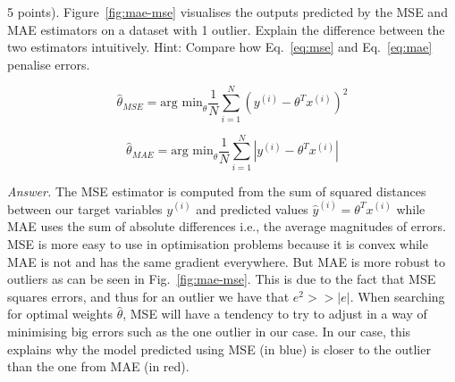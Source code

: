 \documentclass[10pt]{article}
\newenvironment{exercise}[2][Exercise]{\begin{trivlist}
  \item[\hskip \labelsep {\bfseries #1}\hskip \labelsep {\bfseries #2.}]}{\end{trivlist}}
\begin{document}
  \begin{exercise}{1} 
  (5 points).
  Figure~\ref{fig:mae-mse} visualises the outputs predicted by the MSE
and MAE estimators on a dataset with 1 outlier. Explain the difference between the two estimators intuitively. Hint: Compare how Eq.~\ref{eq:mse} and Eq.~\ref{eq:mae} penalise errors. 

\begin{equation}\label{eq:mse}
    \hat\theta_{MSE} = \text{arg min}_\theta \frac{1}{N} \sum_{i=1}^N(y^{(i)}-\theta^Tx^{(i)})^2
\end{equation}

\begin{equation}\label{eq:mae}
    \hat\theta_{MAE} = \text{arg min}_\theta  \frac{1}{N} \sum_{i=1}^N|y^{(i)}-\theta^Tx^{(i)}|
\end{equation}


\textit{Answer.} The MSE estimator is computed from the sum of squared distances between our target variables $y^{(i)}$ and predicted values $\hat y^{(i)} = \theta^Tx^{(i)}$ while MAE uses the sum of absolute differences i.e., the average magnitudes of errors. MSE is more easy to use in optimisation problems because it is convex while MAE is not and has the same gradient everywhere. But MAE is more robust to outliers as can be seen in Fig.~\ref{fig:mae-mse}. This is due to the fact that MSE squares errors, and thus for an outlier we have that $e^2 >> |e|$. When searching for optimal weights $\hat\theta$, MSE will have a tendency to try to adjust in a way of minimising big errors such as the one outlier in our case. In our case, this explains why the model predicted using MSE (in blue) is closer to the outlier than the one from MAE (in red). 
  \end{exercise}
\end{document}
